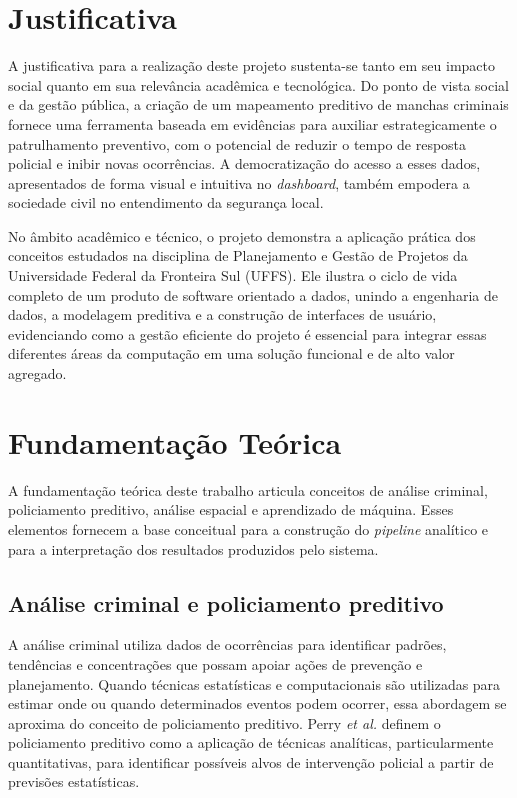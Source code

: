 \documentclass[12pt]{article}
\begin{document}
\section{Justificativa}
A justificativa para a realização deste projeto sustenta-se tanto em seu impacto social quanto em sua relevância acadêmica e tecnológica. Do ponto de vista social e da gestão pública, a criação de um mapeamento preditivo de manchas criminais fornece uma ferramenta baseada em evidências para auxiliar estrategicamente o patrulhamento preventivo, com o potencial de reduzir o tempo de resposta policial e inibir novas ocorrências. A democratização do acesso a esses dados, apresentados de forma visual e intuitiva no \textit{dashboard}, também empodera a sociedade civil no entendimento da segurança local.

No âmbito acadêmico e técnico, o projeto demonstra a aplicação prática dos conceitos estudados na disciplina de Planejamento e Gestão de Projetos da Universidade Federal da Fronteira Sul (UFFS). Ele ilustra o ciclo de vida completo de um produto de software orientado a dados, unindo a engenharia de dados, a modelagem preditiva e a construção de interfaces de usuário, evidenciando como a gestão eficiente do projeto é essencial para integrar essas diferentes áreas da computação em uma solução funcional e de alto valor agregado.

\section{Fundamentação Teórica}
A fundamentação teórica deste trabalho articula conceitos de análise criminal, policiamento preditivo, análise espacial e aprendizado de máquina. Esses elementos fornecem a base conceitual para a construção do \textit{pipeline} analítico e para a interpretação dos resultados produzidos pelo sistema.

\subsection{Análise criminal e policiamento preditivo}
A análise criminal utiliza dados de ocorrências para identificar padrões, tendências e concentrações que possam apoiar ações de prevenção e planejamento. Quando técnicas estatísticas e computacionais são utilizadas para estimar onde ou quando determinados eventos podem ocorrer, essa abordagem se aproxima do conceito de policiamento preditivo. Perry \textit{et al.} \cite{perry2013} definem o policiamento preditivo como a aplicação de técnicas analíticas, particularmente quantitativas, para identificar possíveis alvos de intervenção policial a partir de previsões estatísticas.
\end{document}
